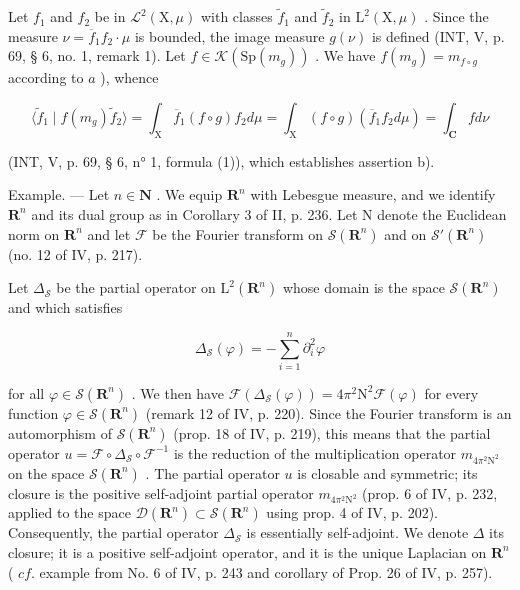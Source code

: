 Let \(f_1\) and \(f_2\) be in \(\mathcal{L}^2(\mathrm{X},\mu)\) with classes \(\widetilde{f}_1\) and \(\widetilde{f}_2\) in \(\mathrm{L}^2(\mathrm{X},\mu)\) . Since the measure \(\nu = \overline{f}_1f_2\cdot \mu\) is bounded, the image measure \(g(\nu)\) is defined (INT, V, p. 69, § 6, no. 1, remark 1). Let \(f\in \mathcal{K}(\mathrm{Sp}(m_g))\) . We have \(f(m_{g}) = m_{f\circ g}\) according to \(a\) ), whence

\[
\langle \widetilde {f} _ {1} \mid f (m _ {g}) \widetilde {f} _ {2} \rangle = \int_ {\mathrm{X}} \overline {{f}} _ {1} (f \circ g) f _ {2} d \mu = \int_ {\mathrm{X}} (f \circ g) (\overline {{f}} _ {1} f _ {2} d \mu) = \int_ {\mathbf {C}} f d \nu
\]

(INT, V, p. 69, § 6, n° 1, formula (1)), which establishes assertion b).

Example. --- Let \(n \in \mathbf{N}\) . We equip \(\mathbf{R}^{n}\) with Lebesgue measure, and we identify \(\mathbf{R}^{n}\) and its dual group as in Corollary 3 of II, p. 236. Let N denote the Euclidean norm on \(\mathbf{R}^{n}\) and let \(\mathcal{F}\) be the Fourier transform on \(\mathcal{S}(\mathbf{R}^{n})\) and on \(\mathcal{S}'(\mathbf{R}^{n})\) (no. 12 of IV, p. 217).

Let \(\Delta_{\mathcal{S}}\) be the partial operator on \(\mathrm{L}^2 (\mathbf{R}^n)\) whose domain is the space \(\mathcal{S}(\mathbf{R}^n)\) and which satisfies

\[
\Delta_ {\mathcal {S}} (\varphi) = - \sum_ {i = 1} ^ {n} \partial_ {i} ^ {2} \varphi
\]

for all \(\varphi\in\mathcal{S}(\mathbf{R}^{n})\) . We then have \(\mathcal{F}(\Delta_{\mathcal{S}}(\varphi))=4\pi^{2}\mathrm{N}^{2}\mathcal{F}(\varphi)\) for every function \(\varphi\in\mathcal{S}(\mathbf{R}^{n})\) (remark 12 of IV, p. 220). Since the Fourier transform is an automorphism of \(\mathcal{S}(\mathbf{R}^{n})\) (prop. 18 of IV, p. 219), this means that the partial operator \(u=\mathcal{F}\circ\Delta_{\mathcal{S}}\circ\mathcal{F}^{-1}\) is the reduction of the multiplication operator \(m_{4\pi^{2}\mathrm{N}^{2}}\) on the space \(\mathcal{S}(\mathbf{R}^{n})\) . The partial operator \(u\) is closable and symmetric; its closure is the positive self-adjoint partial operator \(m_{4\pi^{2}\mathrm{N}^{2}}\) (prop. 6 of IV, p. 232, applied to the space \(\mathcal{D}(\mathbf{R}^{n})\subset\mathcal{S}(\mathbf{R}^{n})\) using prop. 4 of IV, p. 202). Consequently, the partial operator \(\Delta_{\mathcal{S}}\) is essentially self-adjoint. We denote \(\Delta\) its closure; it is a positive self-adjoint operator, and it is the unique Laplacian on \(\mathbf{R}^{n}\) ( \(cf.\) example from No. 6 of IV, p. 243 and corollary of Prop. 26 of IV, p. 257).

